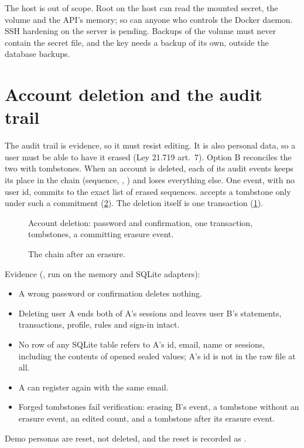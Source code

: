 \documentclass[11pt,a4paper]{article}
\begin{document}
The host is out of scope. Root on the host can read the mounted secret, the volume and the API's memory; so can anyone
who controls the Docker daemon. SSH hardening on the server is pending. Backups of the volume must never contain the
secret file, and the key needs a backup of its own, outside the database backups.

\section{Account deletion and the audit trail}\label{sec:deletion}

The audit trail is evidence, so it must resist editing. It is also personal data, so a user must be able to have it
erased (Ley 21.719 art.~7). Option B reconciles the two with tombstones. When an account is deleted, each of its audit
events keeps its place in the chain (sequence, , ) and loses everything else. One
 event, with no user id, commits to the exact list of erased sequences. 
accepts a tombstone only under such a commitment (\cref{fig:chain}). The deletion itself is one transaction
(\cref{fig:deletion}).

\begin{figure}[htbp]
  \centering
  
  \caption{Account deletion: password and confirmation, one transaction, tombstones, a committing erasure event.}\label{fig:deletion}
\end{figure}

\begin{figure}[htbp]
  \centering
  
  \caption{The chain after an erasure.}\label{fig:chain}
\end{figure}

Evidence (, run on the memory and SQLite adapters):
\begin{itemize}
  \item A wrong password or confirmation deletes nothing.
  \item Deleting user A ends both of A's sessions and leaves user B's statements, transactions, profile, rules and
    sign-in intact.
  \item No row of any SQLite table refers to A's id, email, name or sessions, including the contents of opened sealed
    values; A's id is not in the raw file at all.
  \item A can register again with the same email.
  \item Forged tombstones fail verification: erasing B's event, a tombstone without an erasure event, an edited count,
    and a tombstone after its erasure event.
\end{itemize}
Demo personas are reset, not deleted, and the reset is recorded as .
\end{document}
